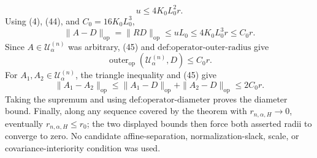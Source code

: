 \[
u\leq4K_0L_0^2r.
\tag{44}
\]
Using (4), (44), and \(C_0=16K_0L_0^3\),
\[
\|A-D\|_{\mathrm{op}}
=\|RD\|_{\mathrm{op}}
\leq uL_0
\leq4K_0L_0^3r
\leq C_0r.
\tag{45}
\]
Since \(A\in\mathcal U^{(n)}_\alpha\) was arbitrary, (45) and \(\text{def:operator-outer-radius}\) give
\[
\operatorname{outer}_{\mathrm{op}}(\mathcal U^{(n)}_\alpha,D)
\leq C_0r.
\]
For \(A_1,A_2\in\mathcal U^{(n)}_\alpha\), the triangle inequality and (45) give
\[
\|A_1-A_2\|_{\mathrm{op}}
\leq\|A_1-D\|_{\mathrm{op}}+\|A_2-D\|_{\mathrm{op}}
\leq2C_0r.
\]
Taking the supremum and using \(\text{def:operator-diameter}\) proves the diameter bound. Finally, along any sequence covered by the theorem with \(r_{n,\alpha,H}\to0\), eventually \(r_{n,\alpha,H}\leq r_0\); the two displayed bounds then force both asserted radii to converge to zero. No candidate affine-separation, normalization-slack, scale, or covariance-interiority condition was used.